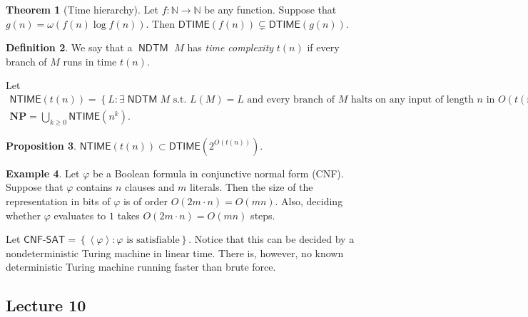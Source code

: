 \documentclass[10pt,letterpaper,cm]{nupset}
\theoremstyle{definition}
\newtheorem{definition}{Definition}[subsection]
\newtheorem{exmp}[definition]{Example}
\theoremstyle{theorem}
\newtheorem{theorem}[definition]{Theorem}
\newtheorem{prop}[definition]{Proposition}
\theoremstyle{remark}
\newcommand{\N}{\mathbb N}
\newcommand{\1}{\mathbf{1}}
\newcommand{\0}{\vec 0}
\DeclareMathOperator{\NDTM}{\mathsf{NDTM}}
\begin{document}
\begin{theorem}[Time hierarchy]
Let $f: \N \to \N$ be any function. Suppose that $g(n) = \omega(f(n) \log{f(n)})$. Then $\mathsf{DTIME}(f(n)) \subsetneq \mathsf{DTIME}(g(n))$.
\end{theorem}

\begin{definition}
We say that a $\NDTM$ $M$ has \textit{time complexity} $t(n)$ if every branch of $M$ runs in time $t(n)$. 
\end{definition}

\smallskip

Let  
\begin{gather*}
\mathsf{NTIME}(t(n)) = \left\{ L : \exists \NDTM M \text{ s.t. }L(M) = L \text{ and every branch of }M\text{ halts on any input of length }n\text{ in }O\left(t(n)\right)\text{ steps}\right\} \\ 
\mathbf{NP} = \bigcup_{k \geq 0} \mathsf{NTIME}(n^k).
\end{gather*} 

\begin{prop}
$\mathsf{NTIME}(t(n)) \subset \mathsf{DTIME}\left(2^{O(t(n))}\right)$.
\end{prop}

\begin{exmp}
Let $\varphi$ be a Boolean formula in conjunctive normal form (CNF). Suppose that $\varphi$ contains $n$ clauses and $m$ literals. Then the size of the representation in bits of $\varphi$ is of order $O(2 m \cdot n) = O(mn)$. Also, deciding whether $\varphi$ evaluates to $1$ takes  $O(2 m \cdot n) = O(mn)$ steps. 

Let $\mathsf{CNF\text{-}SAT} = \left\{\left\langle \varphi \right\rangle : \varphi \text{ is satisfiable}\right\}$. Notice that this can be decided by a nondeterministic Turing machine in linear time.  There is, however, no known deterministic Turing machine running faster than brute force. 
\end{exmp}

\subsection{Lecture 10}
\end{document}
